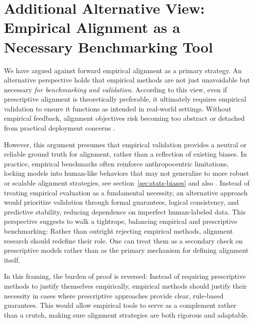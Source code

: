 \documentclass{article}
\theoremstyle{plain}
\theoremstyle{definition}
\theoremstyle{remark}
\begin{document}
\section{Additional Alternative View: Empirical Alignment as a Necessary Benchmarking Tool}\label{app:alt-view}

We have argued against forward empirical alignment as a primary strategy. An alternative perspective holds that empirical methods are not just unavoidable but necessary \textit{for benchmarking and validation}. According to this view, even if prescriptive alignment is theoretically preferable, it ultimately requires empirical validation to ensure it functions as intended in real-world settings. Without empirical feedback, alignment objectives risk becoming too abstract or detached from practical deployment concerns \cite{gao2022aligning, eval_bias_2021}.

However, this argument presumes that empirical validation provides a neutral or reliable ground truth for alignment, rather than a reflection of existing biases. In practice, empirical benchmarks often reinforce anthropocentric limitations, locking models into human-like behaviors that may not generalize to more robust or scalable alignment strategies, see section~\ref{sec:stats-biases} and also \citet{gabriel2020artificial, perdomo2020performative,wang2024towards}. Instead of treating empirical evaluation as a fundamental necessity, an alternative approach would prioritize validation through formal guarantees, logical consistency, and predictive stability, reducing dependence on imperfect human-labeled data.
This perspective suggests to walk a tightrope, balancing empirical and prescriptive benchmarking: Rather than outright rejecting empirical methods, alignment research should redefine their role. One can treat them as a secondary check on prescriptive models rather than as the primary mechanism for defining alignment itself. 

In this framing, the burden of proof is reversed: Instead of requiring prescriptive methods to justify themselves empirically, empirical methods should justify their necessity in cases where prescriptive approaches provide clear, rule-based guarantees. This would allow empirical tools to serve as a complement rather than a crutch, making sure alignment strategies are both rigorous and adaptable.







\newpage

\end{document}
